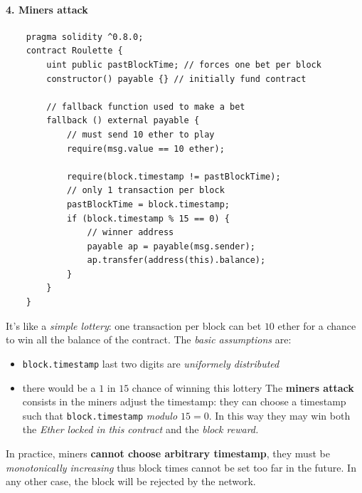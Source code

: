 \documentclass[10pt,a4paper]{report}
\begin{document}
\paragraph{4. Miners attack}\label{sec:4-miners-attack}%
\begin{lstlisting}
	pragma solidity ^0.8.0; 
	contract Roulette { 
		uint public pastBlockTime; // forces one bet per block
		constructor() payable {} // initially fund contract 
		
		// fallback function used to make a bet 
		fallback () external payable { 
			// must send 10 ether to play 
			require(msg.value == 10 ether); 
			
			require(block.timestamp != pastBlockTime); 
			// only 1 transaction per block 
			pastBlockTime = block.timestamp; 
			if (block.timestamp % 15 == 0) { 
				// winner address 
				payable ap = payable(msg.sender);
				ap.transfer(address(this).balance); 
			} 
		} 
	}
\end{lstlisting}

It's like a \textit{simple lottery}: one transaction per block can bet $10$ ether for a chance to win all the balance of the contract. The \textit{basic assumptions} are:
\begin{itemize}
	\item 
	\texttt{block.timestamp} last two digits are \textit{uniformely distributed}
	\item 
	there would be a $1$ in $15$ chance of winning this lottery
	The \textbf{miners attack} consists in the miners adjust the timestamp: they can choose a timestamp such that \texttt{block.timestamp} \textit{modulo $15 = 0$}. In this way they may win both the \textit{Ether locked in this contract} and the \textit{block reward.}
\end{itemize}

In practice, miners \textbf{cannot choose arbitrary timestamp}, they must be \textit{monotonically increasing} thus block times cannot be set too far in the future. In any other case, the block will be rejected by the network.
\end{document}
